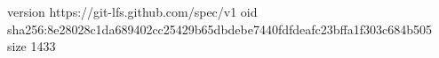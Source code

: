version https://git-lfs.github.com/spec/v1
oid sha256:8e28028c1da689402cc25429b65dbdebe7440fdfdeafc23bffa1f303c684b505
size 1433

